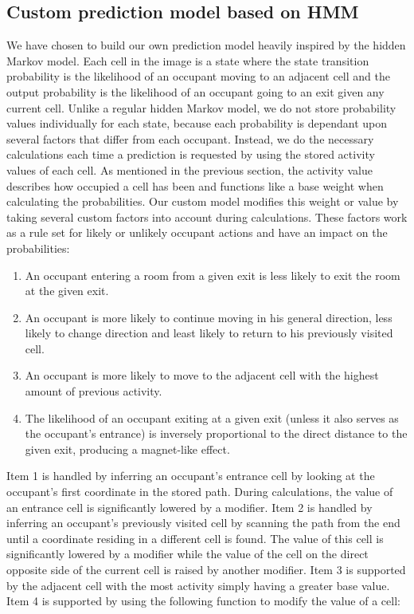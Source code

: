 \subsection{Custom prediction model based on HMM}
\label{ssub:designcustomprediction}
We have chosen to build our own prediction model heavily inspired by the hidden Markov model. Each cell in the image is a state where the state transition probability is the likelihood of an occupant moving to an adjacent cell and the output probability is the likelihood of an occupant going to an exit given any current cell. Unlike a regular hidden Markov model, we do not store probability values individually for each state, because each probability is dependant upon several factors that differ from each occupant. Instead, we do the necessary calculations each time a prediction is requested by using the stored activity values of each cell. As mentioned in the previous section, the activity value describes how occupied a cell has been and functions like a base weight when calculating the probabilities. Our custom model modifies this weight or value by taking several custom factors into account during calculations. These factors work as a rule set for likely or unlikely occupant actions and have an impact on the probabilities:
\begin{enumerate}
\item An occupant entering a room from a given exit is less likely to exit the room at the given exit.
\item An occupant is more likely to continue moving in his general direction, less likely to change direction and least likely to return to his previously visited cell.
\item An occupant is more likely to move to the adjacent cell with the highest amount of previous activity.
\item The likelihood of an occupant exiting at a given exit (unless it also serves as the occupant's entrance) is inversely proportional to the direct distance to the given exit, producing a magnet-like effect.
\end{enumerate}
Item 1 is handled by inferring an occupant's entrance cell by looking at the occupant's first coordinate in the stored path. During calculations, the value of an entrance cell is significantly lowered by a modifier. Item 2 is handled by inferring an occupant's previously visited cell by scanning the path from the end until a coordinate residing in a different cell is found. The value of this cell is significantly lowered by a modifier while the value of the cell on the direct opposite side of the current cell is raised by another modifier. Item 3 is supported by the adjacent cell with the most activity simply having a greater base value. Item 4 is supported by using the following function to modify the value of a cell: \\
